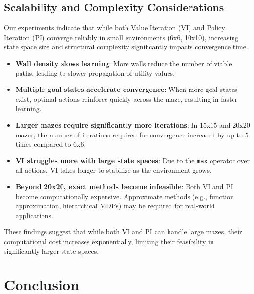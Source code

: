 \documentclass[11pt]{article}
\begin{document}
\subsection{Scalability and Complexity Considerations}
Our experiments indicate that while both Value Iteration (VI) and Policy Iteration (PI) converge reliably in small environments (6x6, 10x10), increasing state space size and structural complexity significantly impacts convergence time.

\begin{itemize}
    \item \textbf{Wall density slows learning}: More walls reduce the number of viable paths, leading to slower propagation of utility values.
    \item \textbf{Multiple goal states accelerate convergence}: When more goal states exist, optimal actions reinforce quickly across the maze, resulting in faster learning.
    \item \textbf{Larger mazes require significantly more iterations}: In 15x15 and 20x20 mazes, the number of iterations required for convergence increased by up to 5 times compared to 6x6.
    \item \textbf{VI struggles more with large state spaces}: Due to the \texttt{max} operator over all actions, VI takes longer to stabilize as the environment grows.
    \item \textbf{Beyond 20x20, exact methods become infeasible}: Both VI and PI become computationally expensive. Approximate methods (e.g., function approximation, hierarchical MDPs) may be required for real-world applications.
\end{itemize}

\noindent These findings suggest that while both VI and PI can handle large mazes, their computational cost increases exponentially, limiting their feasibility in significantly larger state spaces.


\newpage
\section{Conclusion}
\label{sec:conclusion}
\end{document}
